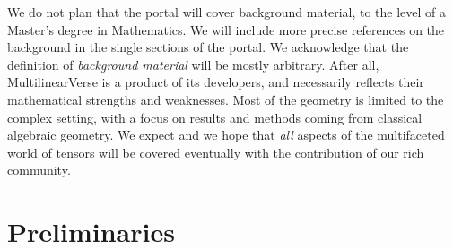We do not plan that the portal will cover background material, to the level of a Master's degree in Mathematics. We will include more precise references on the background in the single sections of the portal. We acknowledge that the definition of \emph{background material} will be mostly arbitrary. After all, MultilinearVerse is a product of its developers, and necessarily reflects their mathematical strengths and weaknesses. Most of the geometry is limited to the complex setting, with a focus on results and methods coming from classical algebraic geometry. We expect and we hope that \emph{all} aspects of the multifaceted world of tensors will be covered eventually with the contribution of our rich community. 

\chapter{Preliminaries}
\label{introduction-chapter-intropreliminaries}

